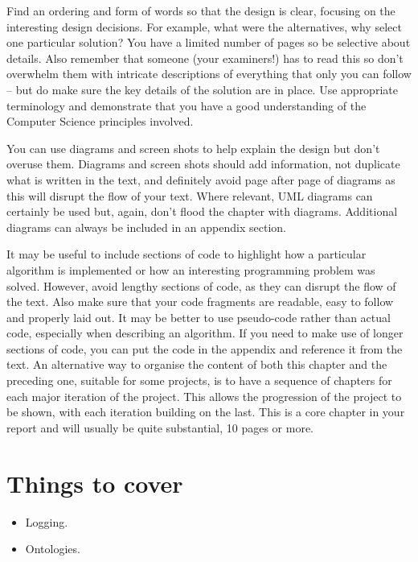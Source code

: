 \documentclass[ openright,titlepage,numbers=noenddot,headinclude,%
                footinclude=true,BCOR=5mm,paper=a4,fontsize=12pt,a4paper,english%
                ]{scrreprt}
\begin{document}
Find an ordering and form of words so that the design is clear, focusing on the interesting design decisions. For example, what were the alternatives, why select one particular solution? You have a limited number of pages so be selective about details. Also remember that someone (your examiners!) has to read this so don’t overwhelm them with intricate descriptions of everything that only you can follow – but do make sure the key details of the solution are in place. Use appropriate terminology and demonstrate that you have a good understanding of the Computer Science principles involved.

You can use diagrams and screen shots to help explain the design but don’t overuse them. Diagrams and screen shots should add information, not duplicate what is written in the text, and definitely avoid page after page of diagrams as this will disrupt the flow of your text. Where relevant, UML diagrams can certainly be used but, again, don’t flood the chapter with diagrams. Additional diagrams can always be included in an appendix section.

It may be useful to include sections of code to highlight how a particular algorithm is implemented or how an interesting programming problem was solved. However, avoid lengthy sections of code, as they can disrupt the flow of the text. Also make sure that your code fragments are readable, easy to follow and properly laid out. It may be better to use pseudo-code rather than actual code, especially when describing an algorithm. If you need to make use of longer sections of code, you can put the code in the appendix and reference it from the text.
An alternative way to organise the content of both this chapter and the preceding one, suitable for some projects, is to have a sequence of chapters for each major iteration of the project. This allows the progression of the project to be shown, with each iteration building on the last.
This is a core chapter in your report and will usually be quite substantial, 10 pages or more.

\section{Things to cover}
\begin{itemize}
\item Logging.
\item Ontologies.
\end{itemize}
\end{document}
